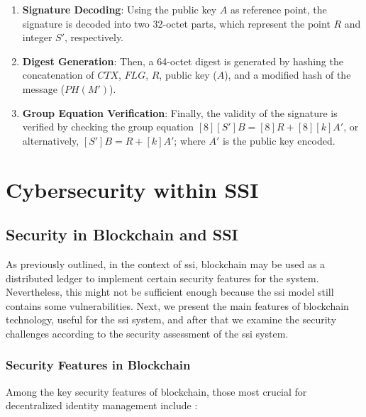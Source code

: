 \begin{enumerate}
  \item \textbf{Signature Decoding}: Using the public key $A$ as reference point, the signature is decoded into two 32-octet parts, which represent the point $R$ and integer 
  $S'$, respectively.
  \item \textbf{Digest Generation}: Then, a 64-octet digest is generated by hashing the concatenation of $CTX$, $FLG$, $R$, public key ($A$), and a modified hash of the message 
  ($PH(M')$).
  \item \textbf{Group Equation Verification}: Finally, the validity of the signature is verified by checking the group equation $[8][S']B = [8]R + [8][k]A'$, or 
  alternatively, $[S']B = R + [k]A'$; where $A'$ is the public key encoded.
\end{enumerate}

\section{Cybersecurity within SSI}

\subsection{Security in Blockchain and SSI}

As previously outlined, in the context of \gls{ssi}, blockchain may be used as a distributed ledger to implement certain security features for the system. Nevertheless, this 
might not be sufficient enough because the \gls{ssi} model still contains some vulnerabilities. Next, we present the main features of blockchain technology, useful for the \gls{ssi} 
system, and after that we examine the security challenges according to the security assessment of the \gls{ssi} system. 

\subsubsection{Security Features in Blockchain}

Among the key security features of blockchain, those most crucial for decentralized identity management include \cite{CyberSecurity}:

